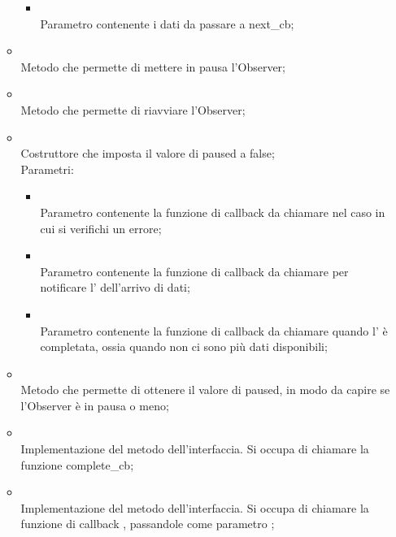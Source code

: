 \begin{itemize}
\begin{itemize}
\begin{itemize}
			\item {} \\
			Parametro contenente i dati da passare a next\_cb;
		\end{itemize}
		\item[]  \\
		Metodo che permette di mettere in pausa l'Observer;\\
		\item[]  \\
		Metodo che permette di riavviare l'Observer;\\
		\item[]  \\
		Costruttore che imposta il valore di paused a false;\\
		Parametri:
		\begin{itemize}
			\item {} \\
			Parametro contenente la funzione di callback da chiamare nel caso in cui si verifichi un errore;
			\item {} \\
			Parametro contenente la funzione di callback da chiamare per notificare l' dell'arrivo di dati;
			\item {} \\
			Parametro contenente la funzione di callback da chiamare quando l' è completata, ossia quando non ci sono più dati disponibili;
		\end{itemize}
		\item[]  \\
		Metodo che permette di ottenere il valore di paused, in modo da capire se l'Observer è in pausa o meno;\\
		\item[]  \\
		Implementazione del metodo dell'interfaccia. Si occupa di chiamare la funzione complete\_cb;\\
		\item[]  \\
		Implementazione del metodo dell'interfaccia. Si occupa di chiamare la funzione di callback , passandole come parametro ;\\

\end{itemize}
\end{itemize}
